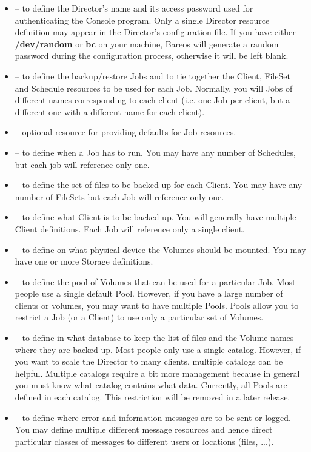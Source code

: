 \begin{itemize}
\item
    -- to  define the Director's
   name and its access password used for authenticating the Console program.
   Only a single  Director resource definition may appear in the Director's
   configuration file.  If you have either {\bf /dev/random} or  {\bf bc} on your
   machine, Bareos will generate a random password during the configuration
   process, otherwise it will  be left blank.
\item
    -- to define the backup/restore Jobs
   and to tie together the Client, FileSet and Schedule resources to  be used
   for each Job. Normally, you will Jobs of different names corresponding
   to each client (i.e. one Job per client, but a different one with a different name
   for each client).
\item
    -- optional resource for
   providing defaults for Job resources.
\item
    -- to define when a Job has to
   run. You may have any number of Schedules, but each job will reference only
   one.
\item
    -- to define the set of files
   to be backed up for each Client. You may have any number of
   FileSets but each Job will reference only one.
\item
    -- to define what Client is to be
   backed up. You will generally have multiple Client definitions. Each
   Job will reference only a single client.
\item
    -- to define on what physical
   device the Volumes should be mounted. You may have one or
   more Storage definitions.
\item
    -- to define the pool of Volumes
   that can be used for a particular Job. Most people use a
   single default Pool.  However, if you have a large number
   of clients or volumes, you may want to have multiple Pools.
   Pools allow you to restrict a Job (or a Client) to use
   only a particular set of Volumes.
\item
    -- to define in what database to
   keep the list of files and the Volume names where they are backed up.
   Most people only use a single catalog.  However, if you want to
   scale the Director to many clients, multiple catalogs can be helpful.
   Multiple catalogs require a bit more management because in general
   you must know what catalog contains what data.  Currently, all
   Pools are defined in each catalog.  This restriction will be removed
   in a later release.
\item
    -- to define where error and
   information messages are to be sent or logged. You may define
   multiple different message resources and hence direct particular
   classes of messages to different users or locations (files, ...).
\end{itemize}



